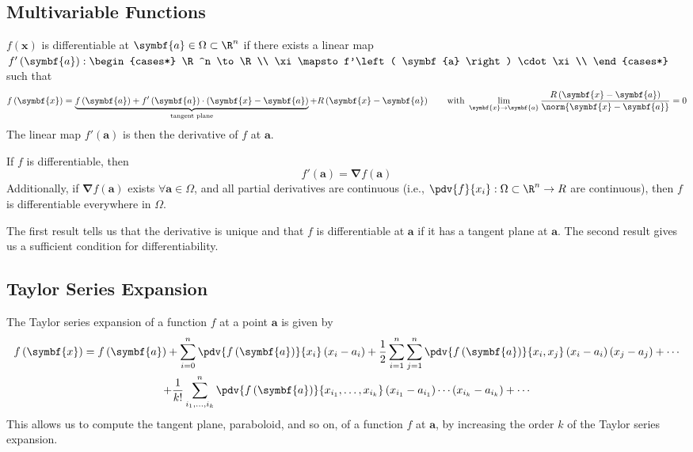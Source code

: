 \documentclass{article}
\begin{document}
\subsection{Multivariable Functions}
\(f\left( \symbf{x} \right)\) is differentiable at \(\symbf{a} \in \Omega \subset \R^n\) if there exists a linear map \(f'\left( \symbf{a} \right) :
\begin{cases*}
    \R^n \to \R                                      \\
    \xi \mapsto f'\left( \symbf{a} \right) \cdot \xi \\
\end{cases*}
\) such that
\begin{equation*}
    f\left( \symbf{x} \right) = \underbrace{f\left( \symbf{a} \right) + f'\left( \symbf{a} \right) \cdot \left( \symbf{x} - \symbf{a} \right)}_{\text{tangent plane}} + R\left( \symbf{x} - \symbf{a} \right) \qquad \text{with } \lim_{\symbf{x} \to \symbf{a}} \frac{R\left( \symbf{x} - \symbf{a} \right)}{\norm{\symbf{x} - \symbf{a}}} = 0
\end{equation*}
The linear map \(f'\left( \symbf{a} \right)\) is then the derivative of \(f\) at \(\symbf{a}\).
\begin{theorem}
    If \(f\) is differentiable, then
    \begin{equation*}
        f'\left( \symbf{a} \right) = \symbf{\nabla} f\left( \symbf{a} \right)
    \end{equation*}
    Additionally, if \(\symbf{\nabla} f\left( \symbf{a} \right)\) exists
    \(\forall \symbf{a} \in \Omega\), and all partial derivatives are
    continuous (i.e., \(\pdv{f}{x_i} : \Omega \subset \R^n \to R\) are
    continuous), then \(f\) is differentiable everywhere in \(\Omega\).
\end{theorem}
The first result tells us that the derivative is unique and that \(f\) is
differentiable at \(\symbf{a}\) if it has a tangent plane at \(\symbf{a}\).
The second result gives us a sufficient condition for differentiability.
\subsection{Taylor Series Expansion}
The Taylor series expansion of a function \(f\) at a point
\(\symbf{a}\) is given by
\begin{multline*}
    f\left( \symbf{x} \right) = f\left( \symbf{a} \right) + \sum_{i = 0}^n \pdv{f\left( \symbf{a} \right)}{x_i} \left( x_i - a_i \right) + \frac{1}{2} \sum_{i = 1}^n \sum_{j = 1}^n \pdv{f\left( \symbf{a} \right)}{x_i,x_j} \left( x_i - a_i \right) \left( x_j - a_j \right) + \cdots \\
    + \frac{1}{k!} \sum_{i_1, \ldots, i_k}^{n} \pdv{f\left( \symbf{a} \right)}{x_{i_1}, \ldots, x_{i_k}} \left( x_{i_1} - a_{i_1} \right) \cdots \left( x_{i_k} - a_{i_k} \right) + \cdots
\end{multline*}
This allows us to compute the tangent plane, paraboloid, and so on, of
a function \(f\) at \(\symbf{a}\), by increasing the order \(k\) of the
Taylor series expansion.
\end{document}
